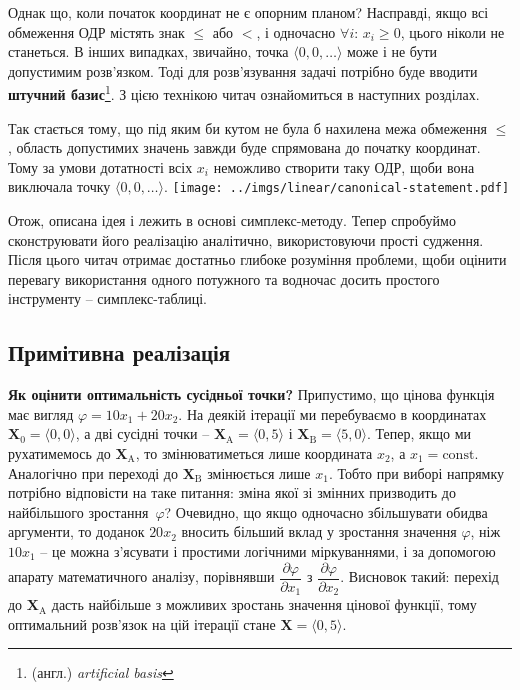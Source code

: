 \documentclass[\main/book.tex]{subfiles}
\begin{document}
Однак що, коли початок координат не є опорним планом? Насправді, якщо всі обмеження ОДР містять знак \flqq{}$\leq$\frqq{} або \flqq{}$<$\frqq{}, і одночасно ${\forall i:}\, {x_i \geq 0}$, цього ніколи не станеться. В інших випадках, звичайно, точка ${\langle 0, 0, \ldots \rangle}$ може і не бути допустимим розв'язком. Тоді для розв'язування задачі потрібно буде вводити \textbf{штучний базис}\footnote{(англ.) \textit{artificial basis}}. З цією технікою читач ознайомиться в наступних розділах.

\begin{note}
 Так стається тому, що під яким би кутом не була б нахилена межа обмеження \flqq{}$\leq$\frqq{}, область допустимих значень завжди буде спрямована до початку координат. Тому за умови дотатності всіх $x_i$ неможливо створити таку ОДР, щоби вона виключала точку ${\langle 0, 0, \ldots \rangle}$.
 \center
 \texttt{[image: ../imgs/linear/canonical-statement.pdf]}
\end{note}

Отож, описана ідея і лежить в основі симплекс-методу. Тепер спробуймо сконструювати його реалізацію аналітично, використовуючи прості судження. Після цього читач отримає достатньо глибоке розуміння проблеми, щоби оцінити перевагу використання одного потужного та водночас досить простого інструменту -- симплекс-таблиці.

\subsection{Примітивна реалізація}

\textbf{Як оцінити оптимальність сусідньої точки?} \quad Припустимо, що цінова функція має вигляд $\varphi = 10 x_1 + 20 x_2$. На деякій ітерації ми перебуваємо в координатах $\mathbf{X}_0 = \langle 0, 0 \rangle$, а дві сусідні точки -- ${\mathbf{X}_\mathrm{A} = \langle 0, 5 \rangle}$ і ${\mathbf{X}_\mathrm{B} = \langle 5, 0 \rangle}$. Тепер, якщо ми рухатимемось до $\mathbf{X}_\mathrm{A}$, то змінюватиметься лише координата $x_2$, а $x_1=\mathrm{const}$. Аналогічно при переході до $\mathbf{X}_\mathrm{B}$ змінюється лише $x_1$. Тобто при виборі напрямку потрібно відповісти на таке питання: зміна якої зі змінних призводить до найбільшого зростання~$\varphi$? Очевидно, що якщо одночасно збільшувати обидва аргументи, то доданок $20x_2$ вносить більший вклад у зростання значення $\varphi$, ніж $10x_1$ -- це можна з'ясувати і простими логічними міркуваннями, і за допомогою апарату математичного аналізу, порівнявши $\dfrac{\partial \varphi}{\partial x_1}$ з $\dfrac{\partial \varphi}{\partial x_2}$. Висновок такий: перехід до $\mathbf{X}_\mathrm{A}$ дасть найбільше з можливих зростань значення цінової функції, тому оптимальний розв'язок на цій ітерації стане $\mathbf{X} = \langle 0, 5 \rangle$.
\end{document}

